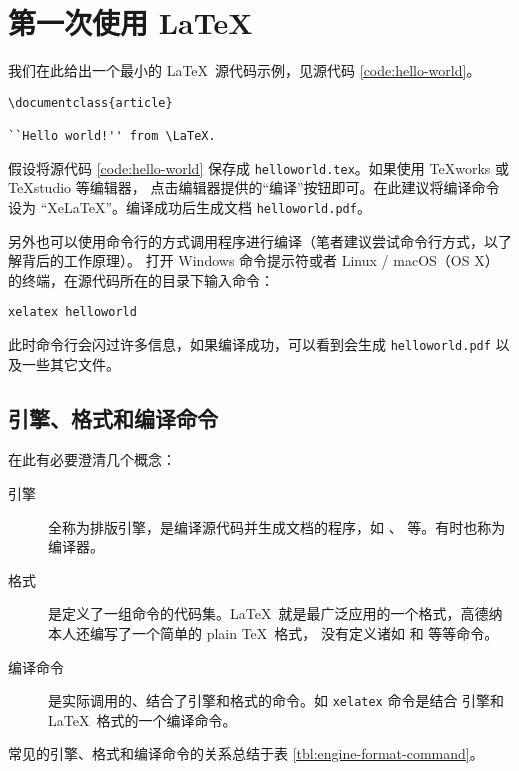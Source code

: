 \section{第一次使用 \LaTeX}\label{sec:run}

我们在此给出一个最小的 \LaTeX\ 源代码示例，见源代码 \ref{code:hello-world}。

\begin{sourcecode}[htp]
\begin{Verbatim}
\documentclass{article}

``Hello world!'' from \LaTeX.

\end{Verbatim}
\caption{\LaTeX\ 的一个最简单的源代码示例。}\label{code:hello-world}
\end{sourcecode}

假设将源代码 \ref{code:hello-world} 保存成 \texttt{helloworld.tex}。如果使用 \TeX works 或 \TeX studio 等编辑器，
点击编辑器提供的“编译”按钮即可。在此建议将编译命令设为 “XeLaTeX”。编译成功后生成文档 \texttt{helloworld.pdf}。

另外也可以使用命令行的方式调用程序进行编译（笔者建议尝试命令行方式，以了解背后的工作原理）。
打开 Windows 命令提示符或者 Linux / macOS（OS X）的终端，在源代码所在的目录下输入命令：
\begin{verbatim}
xelatex helloworld
\end{verbatim}
此时命令行会闪过许多信息，如果编译成功，可以看到会生成 \texttt{helloworld.pdf} 以及一些其它文件。

\subsection{引擎、格式和编译命令}\label{subsec:concepts}

在此有必要澄清几个概念：
\begin{description}
  \item[引擎] 全称为排版引擎，是编译源代码并生成文档的程序，如 、 等。有时也称为编译器。
  \item[格式] 是定义了一组命令的代码集。\LaTeX\ 就是最广泛应用的一个格式，高德纳本人还编写了一个简单的 plain \TeX\ 格式，
  没有定义诸如  和  等等命令。
  \item[编译命令] 是实际调用的、结合了引擎和格式的命令。如 \texttt{xelatex} 命令是结合  
  引擎和 \LaTeX\ 格式的一个编译命令。
\end{description}
常见的引擎、格式和编译命令的关系总结于表 \ref{tbl:engine-format-command}。

